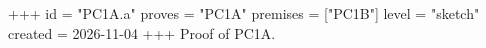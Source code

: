 +++
id = "PC1A.a"
proves = "PC1A"
premises = ["PC1B"]
level = "sketch"
created = 2026-11-04
+++
Proof of PC1A.
